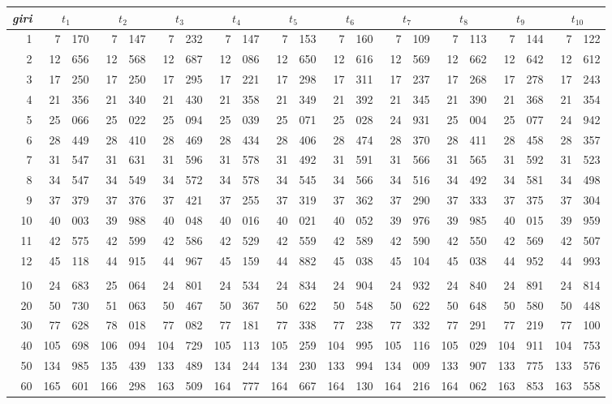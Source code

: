 \begin{tabular}{r *{10}{r@{.}l}}
\emph{giri}
&\multicolumn{2}{c}{$t_1$}
&\multicolumn{2}{c}{$t_2$}
&\multicolumn{2}{c}{$t_3$}
&\multicolumn{2}{c}{$t_4$}
&\multicolumn{2}{c}{$t_5$}
&\multicolumn{2}{c}{$t_6$}
&\multicolumn{2}{c}{$t_7$}
&\multicolumn{2}{c}{$t_8$}
&\multicolumn{2}{c}{$t_9$}
&\multicolumn{2}{c}{$t_{10}$}\\\hline
1 &7&170 &7&147 &7&232 &7&147 &7&153 &7&160 &7&109 &7&113 &7&144 &7&122\\
2 &12&656 &12&568 &12&687 &12&086 &12&650 &12&616 &12&569 &12&662 &12&642 &12&612\\
3 &17&250 &17&250 &17&295 &17&221 &17&298 &17&311 &17&237 &17&268 &17&278 &17&243\\
4 &21&356 &21&340 &21&430 &21&358 &21&349 &21&392 &21&345 &21&390 &21&368 &21&354\\
5 &25&066 &25&022 &25&094 &25&039 &25&071 &25&028 &24&931 &25&004 &25&077 &24&942\\
6 &28&449 &28&410 &28&469 &28&434 &28&406 &28&474 &28&370 &28&411 &28&458 &28&357\\
7 &31&547 &31&631 &31&596 &31&578 &31&492 &31&591 &31&566 &31&565 &31&592 &31&523\\
8 &34&547 &34&549 &34&572 &34&578 &34&545 &34&566 &34&516 &34&492 &34&581 &34&498\\
9 &37&379 &37&376 &37&421 &37&255 &37&319 &37&362 &37&290 &37&333 &37&375 &37&304\\
10 &40&003 &39&988 &40&048 &40&016 &40&021 &40&052 &39&976 &39&985 &40&015 &39&959\\
11 &42&575 &42&599 &42&586 &42&529 &42&559 &42&589 &42&590 &42&550 &42&569 &42&507\\
12 &45&118 &44&915 &44&967 &45&159 &44&882 &45&038 &45&104 &45&038 &44&952 &44&993\\
\\
10 &24&683 &25&064 &24&801 &24&534 &24&834 &24&904 &24&932 &24&840 &24&891 &24&814\\
20 &50&730 &51&063 &50&467 &50&367 &50&622 &50&548 &50&622 &50&648 &50&580 &50&448\\
30 &77&628 &78&018 &77&082 &77&181 &77&338 &77&238 &77&332 &77&291 &77&219 &77&100\\
40 &105&698 &106&094 &104&729 &105&113 &105&259 &104&995 &105&116 &105&029 &104&911 &104&753\\
50 &134&985 &135&439 &133&489 &134&244 &134&230 &133&994 &134&009 &133&907 &133&775 &133&576\\
60 &165&601 &166&298 &163&509 &164&777 &164&667 &164&130 &164&216 &164&062 &163&853 &163&558
\end{tabular}